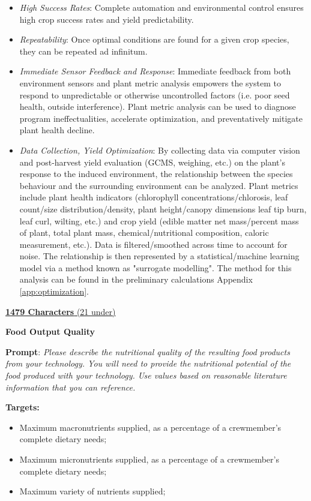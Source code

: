 \documentclass{../tex/report}
\begin{document}
\begin{itemize}
    \item \textit{High Success Rates}: Complete automation and environmental control ensures high crop success rates and yield predictability.
    \item \textit{Repeatability}: Once optimal conditions are found for a given crop species, they can be repeated ad infinitum.
    \item \textit{Immediate Sensor Feedback and Response}: Immediate feedback from both environment sensors and plant metric analysis empowers the system to respond to unpredictable or otherwise uncontrolled factors (i.e. poor seed health, outside interference). Plant metric analysis can be used to diagnose program ineffectualities, accelerate optimization, and preventatively mitigate plant health decline.
    \item \textit{Data Collection, Yield Optimization}: By collecting data via computer vision and post-harvest yield evaluation (GCMS, weighing, etc.) on the plant's response to the induced environment, the relationship between the species behaviour and the surrounding environment can be analyzed. Plant metrics include plant health indicators (chlorophyll concentrations/chlorosis, leaf count/size distribution/density, plant height/canopy dimensions leaf tip burn, leaf curl, wilting, etc.) and crop yield (edible matter net mass/percent mass of plant, total plant mass, chemical/nutritional composition, caloric measurement, etc.). Data is filtered/smoothed across time to account for noise. The relationship is then represented by a statistical/machine learning model via a method known as "surrogate modelling". The method for this analysis can be found in the preliminary calculations Appendix \ref{app:optimization}.
    
\end{itemize}

\uline{\textbf{1479 Characters} (21 under)}

\vspace{0.5cm}

\textbf{Food Output Quality}
\label{sec:resource-outputquality}

\textbf{Prompt}: \textit{Please describe  the nutritional quality of the resulting food products from your technology. You will need to provide the nutritional potential of the food produced with your technology. Use values based on reasonable literature information that you can reference.}

\textbf{Targets:}
\begin{itemize}
    \item Maximum macronutrients supplied, as a percentage of a crewmember’s complete dietary needs;
    \item Maximum micronutrients supplied, as a percentage of a crewmember’s complete dietary needs;
    \item Maximum variety of nutrients supplied;
\end{itemize}
\end{document}
